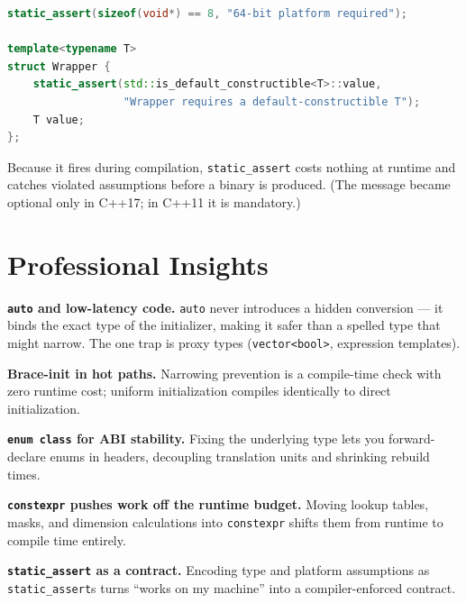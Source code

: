 \begin{lstlisting}[language=C++, caption={static\_assert}]
static_assert(sizeof(void*) == 8, "64-bit platform required");

template<typename T>
struct Wrapper {
    static_assert(std::is_default_constructible<T>::value,
                  "Wrapper requires a default-constructible T");
    T value;
};
\end{lstlisting}

Because it fires during compilation, \texttt{static\_assert} costs nothing at runtime and catches violated assumptions before a binary is produced. (The message became optional only in C++17; in C++11 it is mandatory.)

\section{Professional Insights}

\textbf{\texttt{auto} and low-latency code.} \texttt{auto} never introduces a hidden conversion --- it binds the exact type of the initializer, making it safer than a spelled type that might narrow. The one trap is proxy types (\texttt{vector<bool>}, expression templates).

\textbf{Brace-init in hot paths.} Narrowing prevention is a compile-time check with zero runtime cost; uniform initialization compiles identically to direct initialization.

\textbf{\texttt{enum class} for ABI stability.} Fixing the underlying type lets you forward-declare enums in headers, decoupling translation units and shrinking rebuild times.

\textbf{\texttt{constexpr} pushes work off the runtime budget.} Moving lookup tables, masks, and dimension calculations into \texttt{constexpr} shifts them from runtime to compile time entirely.

\textbf{\texttt{static\_assert} as a contract.} Encoding type and platform assumptions as \texttt{static\_assert}s turns ``works on my machine'' into a compiler-enforced contract.
